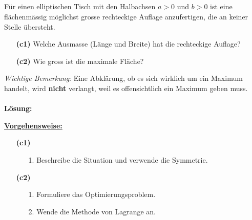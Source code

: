 \subsection*{}
Für einen elliptischen Tisch mit den Halbachsen $ a > 0  $ und $ b > 0 $ ist eine flächenmässig möglichst grosse rechteckige Auflage anzufertigen, die an keiner Stelle übersteht.
\begin{enumerate}
	\item[\textbf{(c1)}]
	Welche Ausmasse (Länge und Breite) hat die rechteckige Auflage?
	\item[\textbf{(c2)}]
	Wie gross ist die maximale Fläche?
\end{enumerate}
\textit{Wichtige Bemerkung}: Eine Abklärung, ob es sich wirklich um ein Maximum handelt, wird \textbf{nicht} verlangt, weil es offensichtlich ein Maximum geben muss.
\\ \\
\textbf{Lösung:}
\begin{mdframed}
\underline{\textbf{Vorgehensweise:}}
\begin{enumerate}
\item[\textbf{(c1)}]
\begin{enumerate}
	\item[1.] Beschreibe die Situation und verwende die Symmetrie. 
\end{enumerate} 
\item[\textbf{(c2)}] 
\begin{enumerate}
	\item[1.] Formuliere das Optimierungsproblem.
	\item[2.] Wende die Methode von Lagrange an. 
\end{enumerate}
\end{enumerate}
\end{mdframed}

